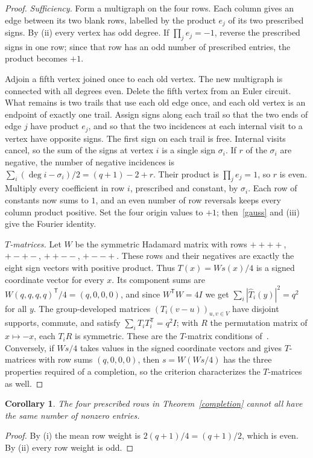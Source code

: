 \documentclass[11pt]{article}
\newtheorem{corollary}[theorem]{Corollary}
\theoremstyle{remark}
\begin{document}
\begin{proof}
\emph{Sufficiency.} Form a multigraph on the four rows. Each column gives an edge between its two blank rows, labelled by the product $e_j$ of its two prescribed signs. By (ii) every vertex has odd degree. If $\prod_je_j=-1$, reverse the prescribed signs in one row; since that row has an odd number of prescribed entries, the product becomes $+1$.

Adjoin a fifth vertex joined once to each old vertex. The new multigraph is connected with all degrees even. Delete the fifth vertex from an Euler circuit. What remains is two trails that use each old edge once, and each old vertex is an endpoint of exactly one trail. Assign signs along each trail so that the two ends of edge $j$ have product $e_j$, and so that the two incidences at each internal visit to a vertex have opposite signs. The first sign on each trail is free. Internal visits cancel, so the sum of the signs at vertex $i$ is a single sign $\sigma_i$. If $r$ of the $\sigma_i$ are negative, the number of negative incidences is $\sum_i(\deg i-\sigma_i)/2=(q+1)-2+r$. Their product is $\prod_je_j=1$, so $r$ is even. Multiply every coefficient in row $i$, prescribed and constant, by $\sigma_i$. Each row of constants now sums to $1$, and an even number of row reversals keeps every column product positive. Set the four origin values to $+1$; then~\eqref{gauss} and (iii) give the Fourier identity.

\emph{$T$-matrices.} Let $W$ be the symmetric Hadamard matrix with rows $++++$, $+-+-$, $++--$, $+--+$. These rows and their negatives are exactly the eight sign vectors with positive product. Thus $T(x)=Ws(x)/4$ is a signed coordinate vector for every $x$. Its component sums are $W(q,q,q,q)^{\mathsf T}/4=(q,0,0,0)$, and since $W^{\mathsf T}W=4I$ we get $\sum_i|\widehat T_i(y)|^2=q^2$ for all $y$. The group-developed matrices $(T_i(v-u))_{u,v\in V}$ have disjoint supports, commute, and satisfy $\sum_iT_iT_i^{\mathsf T}=q^2I$; with $R$ the permutation matrix of $x\mapsto-x$, each $T_iR$ is symmetric. These are the $T$-matrix conditions of~\cite[Definition~7]{XXS}. Conversely, if $Ws/4$ takes values in the signed coordinate vectors and gives $T$-matrices with row sums $(q,0,0,0)$, then $s=W(Ws/4)$ has the three properties required of a completion, so the criterion characterizes the $T$-matrices as well.
\end{proof}

\begin{corollary}\label{orbit}
The four prescribed rows in Theorem~\ref{completion} cannot all have the same number of nonzero entries.
\end{corollary}
\begin{proof}
By (i) the mean row weight is $2(q+1)/4=(q+1)/2$, which is even. By (ii) every row weight is odd.
\end{proof}
\end{document}
